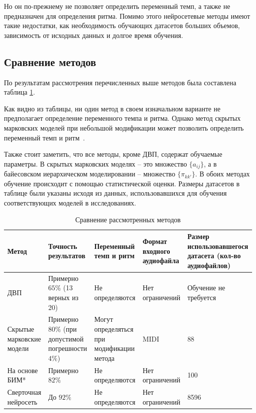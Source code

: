 Но он по-прежнему не позволяет определить переменный темп, а также не предназначен для определения ритма. Помимо этого нейросетевые методы имеют такие недостатки, как необходимость обучающих датасетов больших объемов, зависимость от исходных данных и долгое время обучения.

\subsection{Сравнение методов}

По результатам рассмотрения перечисленных выше методов была составлена таблица \ref{tbl:compare}.

Как видно из таблицы, ни один метод в своем изначальном варианте не предполагает определение переменного темпа и ритма. Однако метод скрытых марковских моделей при небольшой модификации может позволить определить переменный темп и ритм~\cite{hmm}.

Также стоит заметить, что все методы, кроме ДВП, содержат обучаемые параметры. В скрытых марковских моделях -- это множество $\{a_{ij}\}$, а в байесовском иерархическом моделировании -- множество $\{\pi_{kk'}\}$. В обоих методах обучение происходит с помощью статистической оценки. Размеры датасетов в таблице были указаны исходя из данных, использовавшихся для обучения соответствующих моделей в исследованиях.

\begin{table}[h!]
	\begin{center}
		\caption{\label{tbl:compare}Сравнение рассмотренных методов}
		\begin{tabular}{|p{2.5cm}|p{3cm}|p{3cm}|p{3cm}|p{3cm}|}
			\hline
			Метод & Точность результатов & Переменный темп и ритм & Формат входного аудиофайла & Размер использовавшегося датасета (кол-во аудиофайлов) \\\hline
			ДВП & Примерно $65\%$ (13 верных из 20)~\cite{dwt} & Не определяются  & Нет ограничений & Обучение не требуется\\\hline
			Скрытые марковские модели & Примерно $80\%$ (при допустимой погрешности $4\%$) & Могут определяться при модификации метода & MIDI & 88~\cite{hmm}\\\hline
			На основе БИМ* & Примерно $82\%$ & Не определяются  & Нет ограничений & 100~\cite{bayesian}\\\hline
			Сверточная нейросеть & До $92\%$  & Не определяются  & Нет ограничений & 8596~\cite{cnn}\\\hline
		\end{tabular}
	\end{center}
\end{table}

